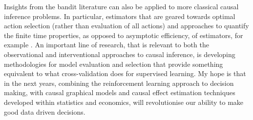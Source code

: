 \documentclass[11pt,a4paper,twoside]{report}
\theoremstyle{plain}
\theoremstyle{definition}
\begin{document}
Insights from the bandit literature can also be applied to more classical causal inference problems. In particular, estimators that are geared towards optimal action selection (rather than evaluation of all actions) and approaches to quantify the finite time properties, as opposed to asymptotic efficiency, of estimators, for example \citep{li2014minimax}. An important line of research, that is relevant to both the observational and interventional approaches to causal inference, is developing methodologies for model evaluation and selection that provide something equivalent to what cross-validation does for supervised learning. My hope is that in the next years, combining the reinforcement learning approach to decision making, with causal graphical models and causal effect estimation techniques developed within statistics and economics, will revolutionise our ability to make good data driven decisions. 

\end{document}
